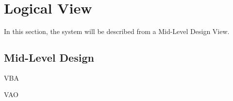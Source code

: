 \section{Logical View}
\label{section:logView}

In this section, the system will be described from a Mid-Level Design View.

\subsection{Mid-Level Design}


VBA

VAO

